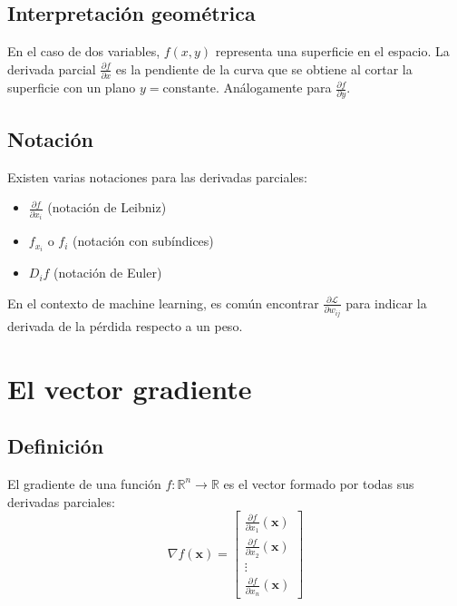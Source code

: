 \documentclass[12pt,a4paper,openany,oneside]{book}
\begin{document}
\subsection{Interpretación geométrica}
En el caso de dos variables, $f(x, y)$ representa una superficie en el espacio. La derivada parcial $\frac{\partial f}{\partial x}$ es la pendiente de la curva que se obtiene al cortar la superficie con un plano $y = \text{constante}$. Análogamente para $\frac{\partial f}{\partial y}$.

\begin{center}
\end{center}

\subsection{Notación}
Existen varias notaciones para las derivadas parciales:
\begin{itemize}
    \item $\frac{\partial f}{\partial x_i}$ (notación de Leibniz)
    \item $f_{x_i}$ o $f_{i}$ (notación con subíndices)
    \item $D_i f$ (notación de Euler)
\end{itemize}
En el contexto de machine learning, es común encontrar $\frac{\partial \mathcal{L}}{\partial w_{ij}}$ para indicar la derivada de la pérdida respecto a un peso.

\section{El vector gradiente}

\subsection{Definición}
El gradiente de una función $f: \mathbb{R}^n \to \mathbb{R}$ es el vector formado por todas sus derivadas parciales:
\[
\nabla f(\mathbf{x}) = \begin{bmatrix}
\frac{\partial f}{\partial x_1}(\mathbf{x}) \\
\frac{\partial f}{\partial x_2}(\mathbf{x}) \\
\vdots \\
\frac{\partial f}{\partial x_n}(\mathbf{x})
\end{bmatrix}
\]
\end{document}
